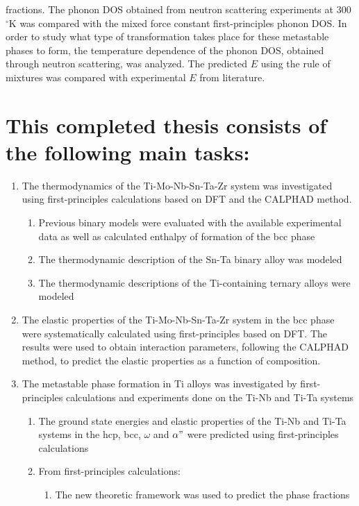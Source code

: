 fractions. The phonon DOS obtained from neutron scattering experiments at 300 $^\circ$K was compared with the mixed force constant first-principles phonon DOS. In order to study what type of transformation takes place for these metastable phases to form, the temperature dependence of the phonon DOS, obtained through neutron scattering, was analyzed. The predicted $E$ using the rule of mixtures was compared with experimental $E$ from literature.


\pagebreak
\section*{This completed thesis consists of the following main tasks:}

\begin{enumerate}
	\item The thermodynamics of the Ti-Mo-Nb-Sn-Ta-Zr system was investigated using first-principles calculations based on DFT and the CALPHAD method. 
	\begin{enumerate}
		\item Previous binary models were evaluated with the available experimental data as well as calculated enthalpy of formation of the bcc phase 
		\item The thermodynamic description of the Sn-Ta binary alloy was modeled
		\item The thermodynamic descriptions of the Ti-containing ternary alloys were modeled
	\end{enumerate}
	\item The elastic properties of the Ti-Mo-Nb-Sn-Ta-Zr system in the bcc phase were systematically calculated using first-principles based on DFT. The results were used to obtain interaction parameters, following the CALPHAD method, to predict the elastic properties as a function of composition. 
	\item The metastable phase formation in Ti alloys was investigated by first-principles calculations and experiments done on the Ti-Nb and Ti-Ta systems
	\begin{enumerate}
		\item The ground state energies and elastic properties of the Ti-Nb and Ti-Ta systems in the hcp, bcc, $\omega$ and $\alpha"$ were predicted using first-principles calculations
		\item From first-principles calculations:
			\begin{enumerate}
			\item The new theoretic framework was used to predict the phase fractions

\end{enumerate}
\end{enumerate}
\end{enumerate}
